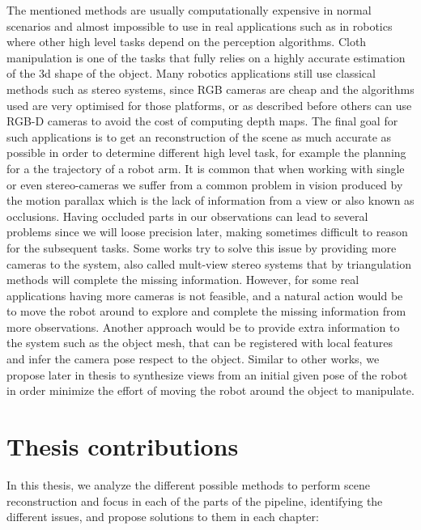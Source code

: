 The mentioned methods are usually computationally expensive in normal scenarios and almost impossible to use in real applications such as in robotics where other high level tasks depend on the perception algorithms. Cloth manipulation is one of the tasks that fully relies on a highly accurate estimation of the 3d shape of the object. Many robotics applications still use classical methods such as stereo systems, since RGB cameras are cheap and the algorithms used are very optimised for those platforms, or as described before others can use RGB-D cameras to avoid the cost of computing depth maps. The final goal for such applications is to get an reconstruction of the scene as much accurate as possible in order to determine different high level task, for example the planning for a the trajectory of a robot arm. It is common that when working with single or even stereo-cameras we suffer from a common problem in vision produced by the motion parallax which is the lack of information from a view or also known as occlusions. Having occluded parts in our observations can lead to several problems since we will loose precision later, making sometimes difficult to reason for the subsequent tasks. Some works try to solve this issue by providing more cameras to the system, also called mult-view stereo systems that by triangulation methods will complete the missing information. However, for some real applications having more cameras is not feasible, and a natural action would be to move the robot around to explore and complete the missing information from more observations. Another approach would be to provide extra information to the system such as the object mesh, that can be registered with local features and infer the camera pose respect to the object. Similar to other works, we propose later in thesis to synthesize views from an initial given pose of the robot in order minimize the effort of moving the robot around the object to manipulate.

\section{Thesis contributions} 

In this thesis, we analyze the different possible methods to perform scene reconstruction and focus in each of the parts of the pipeline, identifying the different issues, and propose solutions to them in each chapter:

